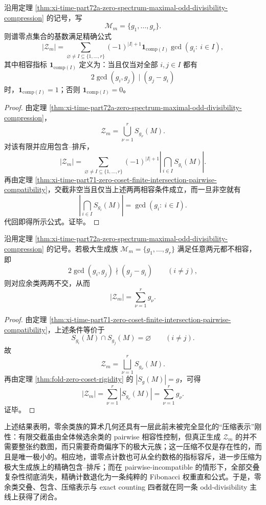 \begin{theorem}[极大奇商生成族上的谱零点集合精确容斥公式]\label{thm:xi-time-part72a-zero-spectrum-maximal-family-inclusion-exclusion}
沿用定理 \ref{thm:xi-time-part72a-zero-spectrum-maximal-odd-divisibility-compression} 的记号，写
\[
\mathcal M_m=\{g_1,\dots,g_r\}.
\]
则谱零点集合的基数满足精确公式
\[
|\mathcal Z_m|
=
\sum_{\varnothing\neq I\subseteq \{1,\dots,r\}}
(-1)^{|I|+1}
\mathbf 1_{\mathrm{comp}(I)}
\gcd(g_i:\ i\in I),
\]
其中相容指标 \(\mathbf 1_{\mathrm{comp}(I)}\) 定义为：当且仅当对全部 \(i,j\in I\) 都有
\[
2\gcd(g_i,g_j)\mid (g_j-g_i)
\]
时，\(\mathbf 1_{\mathrm{comp}(I)}=1\)；否则 \(\mathbf 1_{\mathrm{comp}(I)}=0\)。
\end{theorem}
\begin{proof}
由定理 \ref{thm:xi-time-part72a-zero-spectrum-maximal-odd-divisibility-compression}，
\[
\mathcal Z_m=\bigcup_{\nu=1}^{r}S_{g_\nu}(M).
\]
对该有限并应用包含--排斥，
\[
|\mathcal Z_m|
=
\sum_{\varnothing\neq I\subseteq \{1,\dots,r\}}
(-1)^{|I|+1}
\left|
\bigcap_{i\in I}S_{g_i}(M)
\right|.
\]
再由定理 \ref{thm:xi-time-part71-zero-coset-finite-intersection-pairwise-compatibility}，交截非空当且仅当上述两两相容条件成立，而一旦非空就有
\[
\left|
\bigcap_{i\in I}S_{g_i}(M)
\right|
=
\gcd(g_i:\ i\in I).
\]
代回即得所示公式。证毕。
\end{proof}

\begin{corollary}\label{cor:xi-time-part72a-zero-spectrum-maximal-family-pairwise-incompatible-exact-sum}
沿用定理 \ref{thm:xi-time-part72a-zero-spectrum-maximal-odd-divisibility-compression} 的记号。若极大生成族 \(\mathcal M_m=\{g_1,\dots,g_r\}\) 满足任意两元都不相容，即
\[
2\gcd(g_i,g_j)\nmid (g_j-g_i)
\qquad (i\neq j),
\]
则对应余类两两不交，从而
\[
|\mathcal Z_m|=\sum_{\nu=1}^{r}g_\nu.
\]
\end{corollary}
\begin{proof}
由定理 \ref{thm:xi-time-part71-zero-coset-finite-intersection-pairwise-compatibility}，上述条件等价于
\[
S_{g_i}(M)\cap S_{g_j}(M)=\varnothing
\qquad (i\neq j).
\]
故
\[
\mathcal Z_m=\bigsqcup_{\nu=1}^{r}S_{g_\nu}(M).
\]
再由定理 \ref{thm:fold-zero-coset-rigidity} 的 \(|S_g(M)|=g\)，可得
\[
|\mathcal Z_m|
=
\sum_{\nu=1}^{r}|S_{g_\nu}(M)|
=
\sum_{\nu=1}^{r}g_\nu.
\]
证毕。
\end{proof}

\noindent
上述结果表明，零余类族的算术几何还具有一层此前未被完全显化的“压缩表示”刚性：有限交截虽由全体候选余类的 pairwise 相容性控制，但真正生成 \(\mathcal Z_m\) 的并不需要整张约数图，而只需要奇商偏序下的极大元族；这一压缩不仅是存在性的，而且是唯一极小的。相应地，谱零点计数也可从全约数格的指标容斥，进一步压缩为极大生成族上的精确包含--排斥；而在 pairwise-incompatible 的情形下，全部交叠复杂性彻底消失，精确计数退化为一条纯粹的 Fibonacci 权重直和公式。于是，零余类交叠、包含、压缩表示与 exact counting 四者就在同一条 odd-divisibility 主线上获得了闭合。

